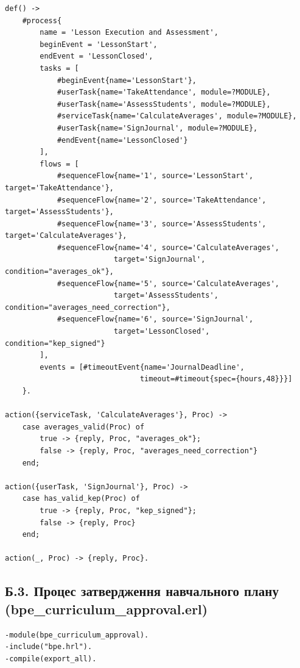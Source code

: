 \documentclass{article}
\begin{document}
\begin{appendix}
\begin{verbatim}
def() ->
    #process{
        name = 'Lesson Execution and Assessment',
        beginEvent = 'LessonStart',
        endEvent = 'LessonClosed',
        tasks = [
            #beginEvent{name='LessonStart'},
            #userTask{name='TakeAttendance', module=?MODULE},
            #userTask{name='AssessStudents', module=?MODULE},
            #serviceTask{name='CalculateAverages', module=?MODULE},
            #userTask{name='SignJournal', module=?MODULE},
            #endEvent{name='LessonClosed'}
        ],
        flows = [
            #sequenceFlow{name='1', source='LessonStart', target='TakeAttendance'},
            #sequenceFlow{name='2', source='TakeAttendance', target='AssessStudents'},
            #sequenceFlow{name='3', source='AssessStudents', target='CalculateAverages'},
            #sequenceFlow{name='4', source='CalculateAverages', 
                         target='SignJournal', condition="averages_ok"},
            #sequenceFlow{name='5', source='CalculateAverages', 
                         target='AssessStudents', condition="averages_need_correction"},
            #sequenceFlow{name='6', source='SignJournal', 
                         target='LessonClosed', condition="kep_signed"}
        ],
        events = [#timeoutEvent{name='JournalDeadline', 
                               timeout=#timeout{spec={hours,48}}}]
    }.

action({serviceTask, 'CalculateAverages'}, Proc) ->
    case averages_valid(Proc) of
        true -> {reply, Proc, "averages_ok"};
        false -> {reply, Proc, "averages_need_correction"}
    end;

action({userTask, 'SignJournal'}, Proc) ->
    case has_valid_kep(Proc) of
        true -> {reply, Proc, "kep_signed"};
        false -> {reply, Proc}
    end;

action(_, Proc) -> {reply, Proc}.
\end{verbatim}

\subsection{Б.3. Процес затвердження навчального плану (bpe\_curriculum\_approval.erl)}
\begin{verbatim}
-module(bpe_curriculum_approval).
-include("bpe.hrl").
-compile(export_all).


\end{verbatim}
\end{appendix}
\end{document}
